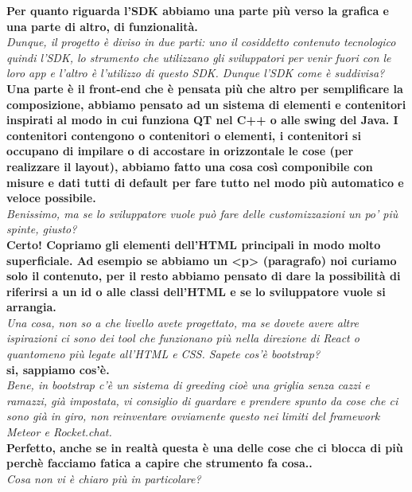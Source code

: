 \documentclass[10 pt,a4paper, openany]{article}
\begin{document}
\textbf{Per quanto riguarda l’SDK abbiamo una parte più verso la grafica e una parte di altro, di funzionalità.}\\
\textit{Dunque, il progetto è diviso in due parti: uno il cosiddetto contenuto tecnologico quindi l’SDK, lo strumento che utilizzano gli sviluppatori per venir fuori con le loro app e l’altro è l’utilizzo di questo SDK. Dunque l’SDK come è suddivisa?}\\

\textbf{Una parte è il front-end che è pensata più che altro per semplificare la composizione, abbiamo pensato ad un sistema di elementi e contenitori inspirati al modo in cui funziona QT nel C++ o alle swing del Java. I contenitori contengono o contenitori o elementi, i contenitori si occupano di impilare o di accostare in orizzontale le cose (per realizzare il layout), abbiamo fatto una cosa così componibile con misure e dati tutti di default per fare tutto nel modo più automatico e veloce possibile.}\\
\textit{Benissimo, ma se lo sviluppatore vuole può fare delle customizzazioni un po’ più spinte, giusto?}\\

\textbf{Certo! 
	Copriamo gli elementi dell’HTML principali in modo molto superficiale. Ad esempio se abbiamo un <p> (paragrafo) noi curiamo solo il contenuto, per il resto abbiamo pensato di dare la possibilità di riferirsi a un id o alle classi dell’HTML e se lo sviluppatore vuole si arrangia.}\\
\textit{Una cosa, non so a che livello avete progettato, ma se dovete avere altre ispirazioni ci sono dei tool che funzionano più nella direzione di React o quantomeno più legate all’HTML e CSS. Sapete cos'è bootstrap?}\\

\textbf{si, sappiamo cos'è.}\\
\textit{Bene, in bootstrap c'è un sistema di greeding cioè una griglia senza cazzi e ramazzi, già impostata, vi consiglio di guardare e prendere spunto da cose che ci sono già in giro, non reinventare ovviamente questo nei limiti del framework Meteor e Rocket.chat.}\\

\textbf{Perfetto, anche se in realtà questa è una delle cose che ci blocca di più perchè facciamo fatica a capire che strumento fa cosa..}\\
\textit{Cosa non vi è chiaro più in particolare?}\\
\end{document}
